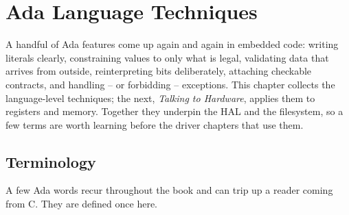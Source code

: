 \chapter{Ada Language Techniques}
\label{ch:embedded}

A handful of Ada features come up again and again in embedded code: writing
literals clearly, constraining values to only what is legal, validating data that
arrives from outside, reinterpreting bits deliberately, attaching checkable
contracts, and handling -- or forbidding -- exceptions. This chapter collects the
language-level techniques; the next, \emph{Talking to Hardware}, applies them to
registers and memory. Together they underpin the HAL and the filesystem, so a few
terms are worth learning before the driver chapters that use them.

\section{Terminology}
\label{sec:terms}

A few Ada words recur throughout the book and can trip up a reader coming from C.
They are defined once here.

